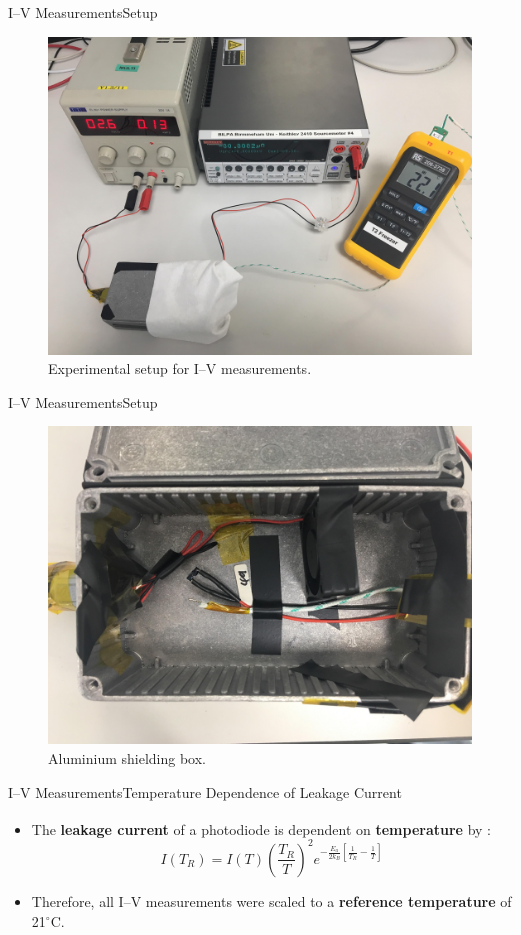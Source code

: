 \documentclass{beamer}
\begin{document}
    \begin{frame}{I--V Measurements}{Setup}
        \begin{figure}
            \centering
            \includegraphics[width = 0.7\linewidth]{IV_Setup.jpg}
            \caption{Experimental setup for I--V measurements.}
            \label{fig:IVSetup}
        \end{figure}
    \end{frame}
    
    \begin{frame}{I--V Measurements}{Setup}
        \begin{figure}
            \centering
            \includegraphics[width = 0.7\linewidth]{Photodiode_Box.jpg}
            \caption{Aluminium shielding box.}
            \label{fig:IVbox}
        \end{figure}
    \end{frame}
    
    \begin{frame}{I--V Measurements}{Temperature Dependence of Leakage Current}
        \begin{itemize}
            \item The \textbf{leakage current} of a photodiode is dependent on \textbf{temperature} by \textsuperscript{\cite{Moll}}:
                \begin{equation*}
                    I(T_R) = I(T) \left(\frac{T_R}{T}\right)^2e^{-\frac{E_a}{2k_B}\left[\frac{1}{T_R}-\frac{1}{T}\right]}
                \end{equation*}
            \item Therefore, all I--V measurements were scaled to a \textbf{reference temperature} of 21${}^\circ$C.
        \end{itemize}
    \end{frame}
    
\end{document}
